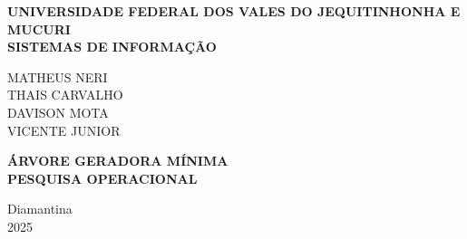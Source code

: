 
\begin{center}

    \Large\textbf{UNIVERSIDADE FEDERAL DOS VALES DO JEQUITINHONHA E MUCURI} \\
    \large\textbf{SISTEMAS DE INFORMAÇÃO}

    \vspace*{5cm}
    \normalsize
    \normalsize 
    \MakeUppercase{Matheus Neri} \\ 
    \MakeUppercase{Thais Carvalho} \\
    \MakeUppercase{Davison Mota} \\
    \MakeUppercase{Vicente Junior}

    \vfill

    \Large\textbf{\MakeUppercase{ÁRVORE GERADORA MÍNIMA}} \\
    \large\textbf{\MakeUppercase{PESQUISA OPERACIONAL}}

    \vfill

    Diamantina \\
    2025

\end{center}
\vspace{0pt}